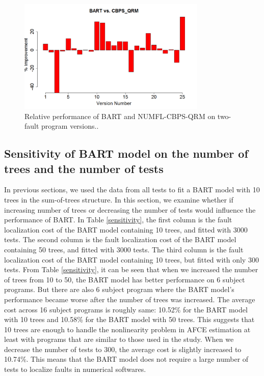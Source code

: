 \begin{figure}[!thpb]
\centering
\includegraphics[width=0.8\textwidth]{chapter4_BARTvsCBPS_M.pdf}
\caption{Relative performance of BART and NUMFL-CBPS-QRM on two-fault program versions..}
\label{BARTvsCBPS_M}
\end{figure}

\subsection{Sensitivity of BART model on the number of trees and  the number of tests}\label{BARTsensitivity}

In previous sections, we used the data from all tests to fit a BART model with 10 trees in the sum-of-trees structure. In this section, we examine whether if increasing number of trees or decreasing the number of tests would influence the performance of BART. In Table \ref{sensitivity}, the first column is the fault localization cost of the BART model containing 10 trees, and fitted with 3000 tests. The second column is the fault localization cost of the BART model containing 50 trees, and fitted with 3000 tests. The third column is the fault localization cost of the BART model containing 10 trees, but fitted with only 300 tests. From Table \ref{sensitivity}, it can be seen that when we increased the number of trees from 10 to 50, the BART model has better performance on 6 subject programs. But there are also 6 subject program where the BART model's performance became worse after the number of trees was increased. The average cost across 16 subject programs is roughly same: 10.52\% for the BART model with 10 trees and 10.58\% for the BART model with 50 trees. This suggests that 10 trees are enough to handle the nonlinearity problem in AFCE estimation at least with programs that are similar to those used in the study.  When we decrease the number of tests to 300, the average cost is slightly increased to 10.74\%.  This means that the BART model does not require a large number of tests to localize faults in numerical softwares.

